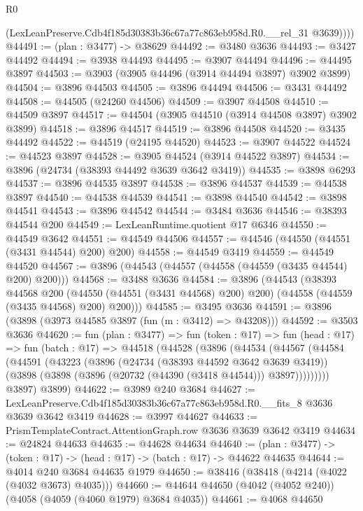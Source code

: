 \begin{lexlean}{R0}
\begin{coremodule}
          (LexLeanPreserve.Cdb4f185d30383b36c67a77c863eb958d.R0.__rel_31 @3639))))
@44491 := (plan : @3477) -> @38629
@44492 := @3480 @3636
@44493 := @3427 @44492
@44494 := @3938 @44493
@44495 := @3907 @44494
@44496 := @44495 @3897
@44503 := @3903 (@3905 @44496 (@3914 @44494 @3897) @3902 @3899)
@44504 := @3896 @44503
@44505 := @3896 @44494
@44506 := @3431 @44492
@44508 := @44505 (@24260 @44506)
@44509 := @3907 @44508
@44510 := @44509 @3897
@44517 := @44504 (@3905 @44510 (@3914 @44508 @3897) @3902 @3899)
@44518 := @3896 @44517
@44519 := @3896 @44508
@44520 := @3435 @44492
@44522 := @44519 (@24195 @44520)
@44523 := @3907 @44522
@44524 := @44523 @3897
@44528 := @3905 @44524 (@3914 @44522 @3897)
@44534 := @3896 (@24734 (@38393 @44492 @3639 @3642 @3419))
@44535 := @3898 @6293
@44537 := @3896 @44535 @3897
@44538 := @3896 @44537
@44539 := @44538 @3897
@44540 := @44538 @44539
@44541 := @3898 @44540
@44542 := @3898 @44541
@44543 := @3896 @44542
@44544 := @3484 @3636
@44546 := @38393 @44544 @200
@44549 := LexLeanRuntime.quotient @17 @6346
@44550 := @44549 @3642
@44551 := @44549 @44506
@44557 := @44546 (@44550 (@44551 (@3431 @44544) @200) @200)
@44558 := @44549 @3419
@44559 := @44549 @44520
@44567 := @3896 (@44543 (@44557 (@44558 (@44559 (@3435 @44544) @200) @200)))
@44568 := @3488 @3636
@44584 := @3896
    (@44543
      (@38393
        @44568
        @200
        (@44550 (@44551 (@3431 @44568) @200) @200)
        (@44558 (@44559 (@3435 @44568) @200) @200)))
@44585 := @3495 @3636
@44591 := @3896 (@3898 (@3973 @44585 @3897 (fun (m : @3412) => @43208)))
@44592 := @3503 @3636
@44620 := fun (plan : @3477) =>
  fun (token : @17) =>
  fun (head : @17) =>
  fun (batch : @17) =>
  @44518
    (@44528
      (@3896
        (@44534
          (@44567
            (@44584
              (@44591
                (@43223
                  (@3896
                    (@24734 (@38393 @44592 @3642 @3639 @3419))
                    (@3898 (@3898 (@3896 (@20732 (@44390 (@3418 @44544))) @3897)))))))))
        @3897)
      @3899)
@44622 := @3989 @240 @3684
@44627 := LexLeanPreserve.Cdb4f185d30383b36c67a77c863eb958d.R0.__fits_8 @3636 @3639 @3642 @3419
@44628 := @3997 @44627
@44633 := PrismTemplateContract.AttentionGraph.row @3636 @3639 @3642 @3419
@44634 := @24824 @44633
@44635 := @44628 @44634
@44640 := (plan : @3477) -> (token : @17) -> (head : @17) -> (batch : @17) -> @44622 @44635
@44644 := @4014 @240 @3684 @44635 @1979
@44650 := @38416 (@38418 (@4214 (@4022 (@4032 @3673) @4035)))
@44660 := @44644 @44650 (@4042 (@4052 @240)) (@4058 (@4059 (@4060 @1979) @3684 @4035))
@44661 := @4068 @44650

\end{coremodule}
\end{lexlean}

